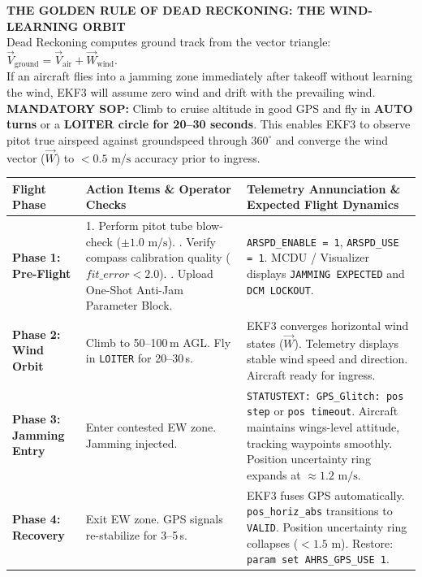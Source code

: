 \documentclass[10pt,letterpaper]{article}
\begin{document}
\vspace{1.5mm}
\begin{tcolorbox}[colback=aerolight,colframe=aeroborder,arc=1.5mm,boxrule=0.7pt,top=2.5mm,bottom=2.5mm,left=4mm,right=4mm]
\textbf{\large\color{aeroblue}THE GOLDEN RULE OF DEAD RECKONING: THE WIND-LEARNING ORBIT} \\[1mm]
{\normalsize Dead Reckoning computes ground track from the vector triangle: $\vec{V}_{\text{ground}} = \vec{V}_{\text{air}} + \vec{W}_{\text{wind}}$. \\
If an aircraft flies into a jamming zone immediately after takeoff without learning the wind, EKF3 will assume zero wind and drift with the prevailing wind. \\[1mm]
\textbf{MANDATORY SOP:} Climb to cruise altitude in good GPS and fly in \textbf{AUTO turns} or a \textbf{LOITER circle for 20--30 seconds}. This enables EKF3 to observe pitot true airspeed against groundspeed through $360^\circ$ and converge the wind vector ($\vec{W}$) to $< 0.5\text{ m/s}$ accuracy prior to ingress.}
\end{tcolorbox}

\vspace{2mm}
\noindent
\footnotesize
\renewcommand{\arraystretch}{1.2}
\begin{tabularx}{\textwidth}{L{0.18\textwidth} L{0.32\textwidth} Y}
\toprule
{}
\textbf{Flight Phase} & \textbf{Action Items \& Operator Checks} & \textbf{Telemetry Annunciation \& Expected Flight Dynamics} \\
\midrule
\textbf{Phase 1: Pre-Flight} & 
1. Perform pitot tube blow-check ($\pm 1.0\text{ m/s}$). . Verify compass calibration quality ($fit\_error < 2.0$). . Upload One-Shot Anti-Jam Parameter Block. & 
\texttt{ARSPD\_ENABLE = 1}, \texttt{ARSPD\_USE = 1}. \newline
MCDU / Visualizer displays \texttt{JAMMING EXPECTED} and \texttt{DCM LOCKOUT}. \\
\textbf{Phase 2: Wind Orbit} & 
Climb to 50--100\,m AGL. Fly in \texttt{LOITER} for 20--30\,s. & 
EKF3 converges horizontal wind states ($\vec{W}$). Telemetry displays stable wind speed and direction. Aircraft ready for ingress. \\
\textbf{Phase 3: Jamming Entry} & 
Enter contested EW zone. Jamming injected. & 
\texttt{STATUSTEXT: GPS\_Glitch: pos step} or \texttt{pos timeout}. \newline
Aircraft maintains wings-level attitude, tracking waypoints smoothly. Position uncertainty ring expands at $\approx 1.2\text{ m/s}$. \\
\textbf{Phase 4: Recovery} & 
Exit EW zone. GPS signals re-stabilize for 3--5\,s. & 
EKF3 fuses GPS automatically. \texttt{pos\_horiz\_abs} transitions to \texttt{VALID}. Position uncertainty ring collapses ($< 1.5\text{ m}$). Restore: \texttt{param set AHRS\_GPS\_USE 1}. \\
\bottomrule
\end{tabularx}
\end{document}
